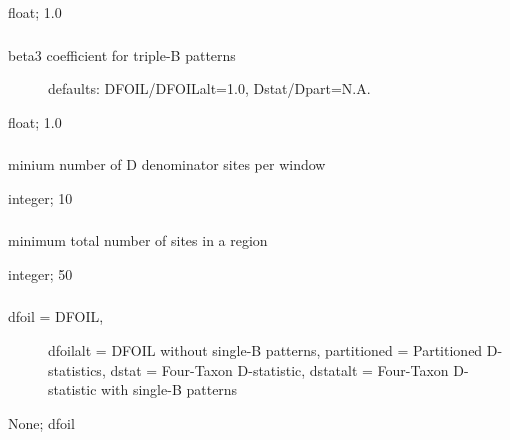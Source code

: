 \documentclass[letterpaper,12pt,english]{sphinxmanual}
\begin{document}
 float;  1.0


\subsubsection{}
\label{\detokenize{prog_desc:beta3}}\begin{description}
\item[{ beta3 coefficient for triple-B patterns}] \leavevmode
defaults: DFOIL/DFOILalt=1.0,
Dstat/Dpart=N.A.

\end{description}

 float;  1.0


\subsubsection{}
\label{\detokenize{prog_desc:mincount}}
 minium number of D denominator sites per window

 integer;  10


\subsubsection{}
\label{\detokenize{prog_desc:mintotal}}
 minimum total number of sites in a region

 integer;  50


\subsubsection{}
\label{\detokenize{prog_desc:mode}}\begin{description}
\item[{ dfoil = DFOIL,}] \leavevmode
dfoilalt = DFOIL without single-B patterns,
partitioned = Partitioned D-statistics,
dstat = Four-Taxon D-statistic,
dstatalt = Four-Taxon D-statistic
with single-B patterns

\end{description}

 None;  dfoil
\end{document}
